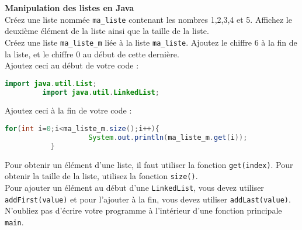 	\begin{Exercice}[10 minutes] \textbf{Manipulation des listes en Java}\\
      	Créez une liste nommée \lstinline{ma_liste} contenant les nombres 1,2,3,4 et 5. Affichez le deuxième élément de la liste ainsi que la taille de la liste. \\
      	
      	Créez une liste \lstinline{ma_liste_m} liée à la liste \lstinline{ma_liste}. Ajoutez le chiffre 6 à la fin de la liste, et le chiffre 0 au début de cette dernière. \\
      	
      	Ajoutez ceci au début de votre code : \\
       
      	\begin{lstlisting}[language=Java]
             import java.util.List;
	     import java.util.LinkedList; \end{lstlisting}
	     
	     Ajoutez ceci à la fin de votre code : \\
	     
	    \begin{lstlisting}[language=Java]
             for(int i=0;i<ma_liste_m.size();i++){
            		System.out.println(ma_liste_m.get(i));
	       } \end{lstlisting} 
    
        \begin{conseil}
            Pour obtenir un élément d'une liste, il faut utiliser la fonction \lstinline{get(index)}. Pour obtenir la taille de la liste, utilisez la fonction \lstinline{size()}. \\
            
            Pour ajouter un élément au début d'une \lstinline{LinkedList}, vous devez utiliser \lstinline{addFirst(value)} et pour l'ajouter à la fin, vous devez utiliser \lstinline{addLast(value)}. \\
            
           	N'oubliez pas d'écrire votre programme à l'intérieur d'une fonction principale \lstinline{main}. \\
           	
           	
		     
        \end{conseil}
        
        \begin{solution}
            
        \end{solution}
    \end{Exercice}
    
